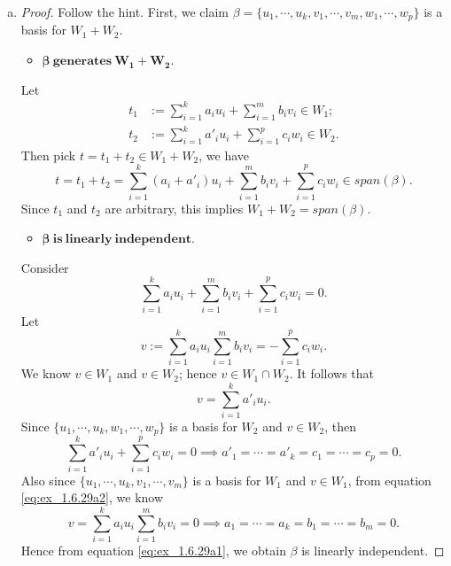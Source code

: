 \begin{Exercise}
	\begin{enumerate}[(a)]
		\item
		\begin{proof}
			Follow the hint. First, we claim $\beta = \{u_1,\cdots,u_k,v_1,\cdots,v_m,w_1,\cdots,w_p\}$ is a basis for $W_1+W_2$. 
			\begin{itemize}
				\item $\mathbf{\boldsymbol{\beta}\ generates\ W_1+W_2}$.
			\end{itemize}
			Let 
			\begin{align*}
			t_1 &:= \sum_{i=1}^{k}a_i u_i + \sum_{i=1}^{m}b_i v_i\in W_1; \\
			t_2 &:= \sum_{i=1}^{k}a'_i u_i + \sum_{i=1}^{p}c_i w_i\in W_2.
			\end{align*}
			Then pick $t = t_1+t_2 \in W_1+W_2$, we have 
			$$
			t = t_1+t_2 = \sum_{i=1}^{k}(a_i+a'_i) u_i + \sum_{i=1}^{m}b_i v_i + \sum_{i=1}^{p}c_i w_i \in span(\beta).
			$$
			Since $t_1$ and $t_2$ are arbitrary, this implies $W_1+W_2 =  span(\beta)$.
			
			\begin{itemize}
				\item $\mathbf{\boldsymbol{\beta}\ is\ linearly\ independent}$.
			\end{itemize}
			Consider
			\begin{equation}\label{eq:ex_1.6.29a1}
			\sum_{i=1}^{k}a_i u_i + \sum_{i=1}^{m}b_i v_i + \sum_{i=1}^{p}c_i w_i = 0.
			\end{equation}
			Let
			\begin{equation}\label{eq:ex_1.6.29a2}
			v := \sum_{i=1}^{k}a_i u_i \sum_{i=1}^{m}b_i v_i = -\sum_{i=1}^{p}c_i w_i.
			\end{equation}
			We know $v\in W_1$ and $v\in W_2$; hence $v\in W_1\cap W_2$. It follows that
			$$
			v = \sum_{i=1}^{k}a'_i u_i.
			$$
			Since $\{u_1, \cdots, u_k, w_1, \cdots, w_p\}$ is a basis for $W_2$ and $v\in W_2$, then
			$$
			\sum_{i=1}^{k}a'_i u_i + \sum_{i=1}^{p}c_i w_i = 0
			\implies
			a'_1 = \cdots = a'_k = c_1 = \cdots = c_p = 0.
			$$
			Also since $\{u_1, \cdots, u_k, v_1, \cdots, v_m\}$ is a basis for $W_1$ and $v\in W_1$, from equation \eqref{eq:ex_1.6.29a2}, we know
			$$
			v = \sum_{i=1}^{k}a_i u_i \sum_{i=1}^{m}b_i v_i = 0
			\implies
			a_1 = \cdots = a_k = b_1 = \cdots = b_m = 0.
			$$
			Hence from equation \eqref{eq:ex_1.6.29a1}, we obtain $\beta$ is linearly independent.
			

\end{proof}
\end{enumerate}
\end{Exercise}
